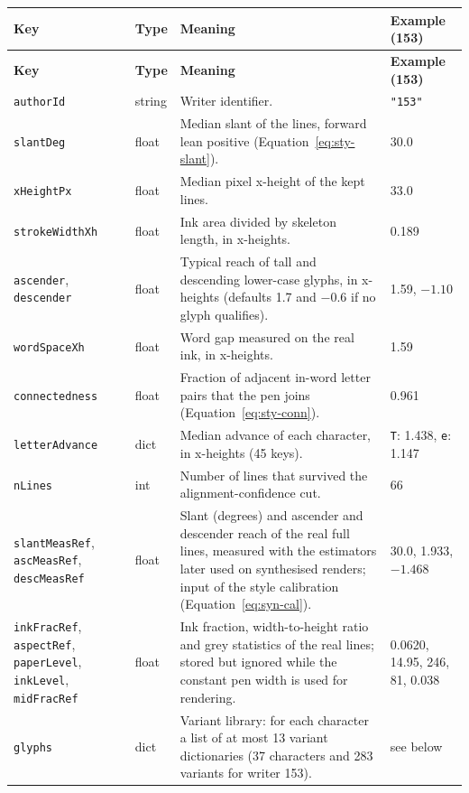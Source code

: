 {
\fontsize{9.5}{11.5}\selectfont
\setlength{\tabcolsep}{4pt}
\begin{longtable}{|p{3.2cm}|p{1.6cm}|p{6.6cm}|p{2.5cm}|}
\hline
\textbf{Key} & \textbf{Type} & \textbf{Meaning} & \textbf{Example (153)} \\
\hline
\endfirsthead
\hline
\textbf{Key} & \textbf{Type} & \textbf{Meaning} & \textbf{Example (153)} \\
\hline
\endhead
\hline
\endfoot
\texttt{authorId} & string & Writer identifier. & \texttt{"153"} \\
\hline
\texttt{slantDeg} & float & Median slant of the lines, forward lean positive (Equation~\ref{eq:sty-slant}). & 30.0 \\
\hline
\texttt{xHeightPx} & float & Median pixel x-height of the kept lines. & 33.0 \\
\hline
\texttt{strokeWidthXh} & float & Ink area divided by skeleton length, in x-heights. & 0.189 \\
\hline
\texttt{ascender}, \texttt{descender} & float & Typical reach of tall and descending lower-case glyphs, in x-heights (defaults 1.7 and $-0.6$ if no glyph qualifies). & 1.59, $-1.10$ \\
\hline
\texttt{wordSpaceXh} & float & Word gap measured on the real ink, in x-heights. & 1.59 \\
\hline
\texttt{connectedness} & float & Fraction of adjacent in-word letter pairs that the pen joins (Equation~\ref{eq:sty-conn}). & 0.961 \\
\hline
\texttt{letterAdvance} & dict & Median advance of each character, in x-heights (45 keys). & \texttt{T}: 1.438, \texttt{e}: 1.147 \\
\hline
\texttt{nLines} & int & Number of lines that survived the alignment-confidence cut. & 66 \\
\hline
\texttt{slantMeasRef}, \texttt{ascMeasRef}, \texttt{descMeasRef} & float & Slant (degrees) and ascender and descender reach of the real full lines, measured with the estimators later used on synthesised renders; input of the style calibration (Equation~\ref{eq:syn-cal}). & 30.0, 1.933, $-1.468$ \\
\hline
\texttt{inkFracRef}, \texttt{aspectRef}, \texttt{paperLevel}, \texttt{inkLevel}, \texttt{midFracRef} & float & Ink fraction, width-to-height ratio and grey statistics of the real lines; stored but ignored while the constant pen width is used for rendering. & 0.0620, 14.95, 246, 81, 0.038 \\
\hline
\texttt{glyphs} & dict & Variant library: for each character a list of at most 13 variant dictionaries (37 characters and 283 variants for writer 153). & see below \\

\end{longtable}}
